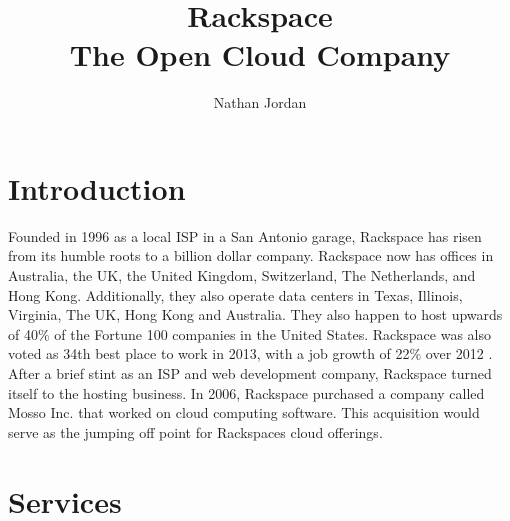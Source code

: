 \documentclass[DIV=calc, paper=letter, fontsize=12pt, twocolumn]{scrartcl}	 %
\title{{\color{goldfishOrange}Rackspace}\\The Open Cloud Company} %
\author{Nathan Jordan } %
\date{} %
\newcommand{\initial}[1]{ %
\lettrine[lines=3,lhang=0.3,nindent=0em]{
\color{goldfishWater}
{\textsf{#1}}}{}}
\begin{document}
\maketitle %

\thispagestyle{fancy} %



\color{dark-gray}



\section*{Introduction}

Founded in 1996 as a local ISP in a San Antonio garage, Rackspace has risen
from its humble roots to a billion dollar company. Rackspace now has offices
in Australia, the UK, the United Kingdom, Switzerland, The Netherlands, and Hong
Kong. Additionally, they also operate data centers in Texas, Illinois, Virginia, The UK,
Hong Kong and Australia. They also happen to host upwards of 40\% of the Fortune 100
companies in the United States\cite{ref:rackspaceMain}.
Rackspace was also voted as 34th best place to
work in 2013, with a job growth of 22\% over 2012 \cite{ref:rackspaceBest}. After
a brief stint as an ISP and web development company, Rackspace turned itself to
the hosting business. In 2006, Rackspace purchased a company called Mosso Inc. 
that worked on cloud computing software. This acquisition would serve as the 
jumping off point for Rackspaces cloud offerings. 

\section*{Services}
\end{document}
